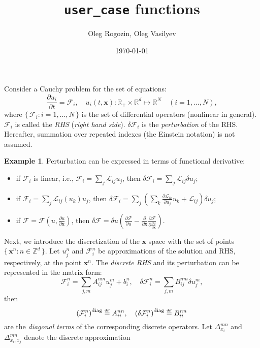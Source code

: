 \documentclass{article}
\title{\texttt{user\_case} functions}
\date{\today}
\author{Oleg Rogozin, Oleg Vasilyev}
\newcommand{\pert}[1]{\delta#1}
\newcommand{\pder}[2][]{\frac{\partial#1}{\partial#2}}      %
\newcommand{\dder}[1]{\Delta_{#1}}                          %
\newcommand{\vder}[2][]{\frac{\pert#1}{\pert#2}}            %
\newcommand{\LL}{\mathcal{L}}
\newcommand{\FF}{\mathcal{F}}
\newcommand{\bx}{\mathbf x}
\newcommand{\diag}[1]{\left(#1\right)^\mathrm{diag}}
\newcommand{\Set}[2]{\{\,{#1}:{#2}\,\}}
\newcommand{\eqdef}{\mathrel{\overset{\makebox[0pt]{\mbox{\normalfont\tiny\sffamily def}}}{=}}}
\theoremstyle{definition}
\newtheorem{example}{Example}
\begin{document}
\maketitle

Consider a Cauchy problem for the set of equations:
\begin{equation}\label{eq:problem}
    \pder[u_i]{t} = \FF_i, \quad
    u_i(t,\bx): \mathbb{R}_+\times\mathbb{R}^d\mapsto\mathbb{R}^N \quad (i=1,\dots,N),
\end{equation}
where \(\Set{\FF_i}{i=1,\dots,N}\) is the set of differential operators (nonlinear in general).
\(\FF_i\) is called the \emph{RHS} (\emph{right hand side}).
\(\pert{\FF_i}\) is the \emph{perturbation} of the RHS.
Hereafter, summation over repeated indexes (the Einstein notation) is not assumed.
\begin{example}
Perturbation can be expressed in terms of functional derivative:
\begin{itemize}
    \item if \(\FF_i\) is linear, i.e., \(\FF_i = \sum_j\LL_{ij}u_j\), then
        \(\pert{\FF_i} = \sum_j\LL_{ij}\pert{u}_j\);
    \item if \(\FF_i = \sum_j\LL_{ij}(u_k)u_j\), then
        \(\pert{\FF_i} = \sum_j\left( \sum_k\pder[\LL_{ik}]{u_j}u_k + \LL_{ij} \right)\pert{u}_j\);
    \item if \(\FF = \FF(u, \pder[u]{\bx})\), then
        \(\pert{\FF} = \pert{u}\left(\pder[\FF]{u} - \pder{\bx}\pder[\FF]{\pder[u]{\bx}}\right)\).
\end{itemize}
\end{example}
Next, we introduce the discretization of the \(\bx\) space with the set of points \(\Set{\bx^n}{n\in\mathbb{Z}^d}\).
Let \(u_j^n\) and \(\FF_i^n\) be approximations of the solution and RHS, respectively, at the point \(\bx^n\).
The \emph{discrete RHS} and its perturbation can be represented in the matrix form:
\begin{equation}\label{eq:matrix_representation}
    \FF_i^n = \sum_{j,m}A_{ij}^{nm}u_j^m + b_i^n,
    \quad \pert{\FF_i^n} = \sum_{j,m}B_{ij}^{nm}\pert{u_j^m},
\end{equation}
then
\begin{equation}\label{eq:diagonal_term}
     \diag{\FF_i^n} \eqdef A_{ii}^{nn}, \quad
     \diag{\pert{\FF_i^n}} \eqdef B_{ii}^{nn}
\end{equation}
are the \emph{diagonal terms} of the corresponding discrete operators.
Let \(\dder{x_i}^{mn}\) and \(\dder{x_i,x_j}^{mn}\) denote the discrete approximation
\end{document}
